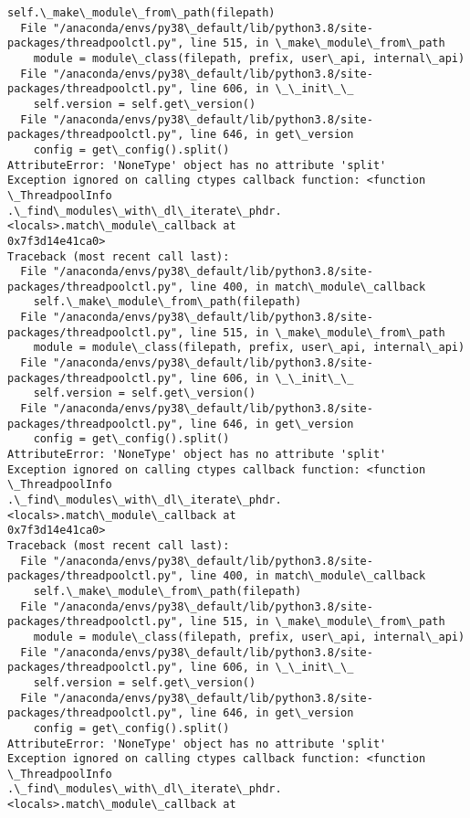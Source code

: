 \documentclass[11pt]{article}
\begin{document}
\begin{Verbatim}[commandchars=\\\{\}]
    self.\_make\_module\_from\_path(filepath)
  File "/anaconda/envs/py38\_default/lib/python3.8/site-
packages/threadpoolctl.py", line 515, in \_make\_module\_from\_path
    module = module\_class(filepath, prefix, user\_api, internal\_api)
  File "/anaconda/envs/py38\_default/lib/python3.8/site-
packages/threadpoolctl.py", line 606, in \_\_init\_\_
    self.version = self.get\_version()
  File "/anaconda/envs/py38\_default/lib/python3.8/site-
packages/threadpoolctl.py", line 646, in get\_version
    config = get\_config().split()
AttributeError: 'NoneType' object has no attribute 'split'
Exception ignored on calling ctypes callback function: <function \_ThreadpoolInfo
.\_find\_modules\_with\_dl\_iterate\_phdr.<locals>.match\_module\_callback at
0x7f3d14e41ca0>
Traceback (most recent call last):
  File "/anaconda/envs/py38\_default/lib/python3.8/site-
packages/threadpoolctl.py", line 400, in match\_module\_callback
    self.\_make\_module\_from\_path(filepath)
  File "/anaconda/envs/py38\_default/lib/python3.8/site-
packages/threadpoolctl.py", line 515, in \_make\_module\_from\_path
    module = module\_class(filepath, prefix, user\_api, internal\_api)
  File "/anaconda/envs/py38\_default/lib/python3.8/site-
packages/threadpoolctl.py", line 606, in \_\_init\_\_
    self.version = self.get\_version()
  File "/anaconda/envs/py38\_default/lib/python3.8/site-
packages/threadpoolctl.py", line 646, in get\_version
    config = get\_config().split()
AttributeError: 'NoneType' object has no attribute 'split'
Exception ignored on calling ctypes callback function: <function \_ThreadpoolInfo
.\_find\_modules\_with\_dl\_iterate\_phdr.<locals>.match\_module\_callback at
0x7f3d14e41ca0>
Traceback (most recent call last):
  File "/anaconda/envs/py38\_default/lib/python3.8/site-
packages/threadpoolctl.py", line 400, in match\_module\_callback
    self.\_make\_module\_from\_path(filepath)
  File "/anaconda/envs/py38\_default/lib/python3.8/site-
packages/threadpoolctl.py", line 515, in \_make\_module\_from\_path
    module = module\_class(filepath, prefix, user\_api, internal\_api)
  File "/anaconda/envs/py38\_default/lib/python3.8/site-
packages/threadpoolctl.py", line 606, in \_\_init\_\_
    self.version = self.get\_version()
  File "/anaconda/envs/py38\_default/lib/python3.8/site-
packages/threadpoolctl.py", line 646, in get\_version
    config = get\_config().split()
AttributeError: 'NoneType' object has no attribute 'split'
Exception ignored on calling ctypes callback function: <function \_ThreadpoolInfo
.\_find\_modules\_with\_dl\_iterate\_phdr.<locals>.match\_module\_callback at

\end{Verbatim}
\end{document}
